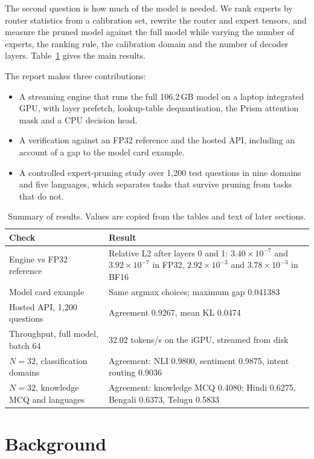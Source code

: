 \documentclass[11pt,a4paper]{article}
\begin{document}
The second question is how much of the model is needed. We rank experts by router statistics from a calibration set, rewrite the router and expert tensors, and measure the pruned model against the full model while varying the number of experts, the ranking rule, the calibration domain and the number of decoder layers. Table~\ref{tab:summary} gives the main results.

The report makes three contributions:
\begin{itemize}
\item A streaming engine that runs the full 106.2\,GB model on a laptop integrated GPU, with layer prefetch, lookup-table dequantisation, the Prism attention mask and a CPU decision head.
\item A verification against an FP32 reference and the hosted API, including an account of a gap to the model card example.
\item A controlled expert-pruning study over 1,200 test questions in nine domains and five languages, which separates tasks that survive pruning from tasks that do not.
\end{itemize}

\begin{table}[!htbp]
\centering
\small
\caption{Summary of results. Values are copied from the tables and text of later sections.}
\label{tab:summary}
\begin{tabular}{p{5.6cm}p{10.4cm}}
\toprule
Check & Result \\
\midrule
Engine vs FP32 reference & Relative L2 after layers 0 and 1: $3.40\times10^{-7}$ and $3.92\times10^{-7}$ in FP32, $2.92\times10^{-3}$ and $3.78\times10^{-3}$ in BF16 \\
Model card example & Same argmax choices; maximum gap 0.041383 \\
Hosted API, 1,200 questions & Agreement 0.9267, mean KL 0.0474 \\
Throughput, full model, batch 64 & 32.02 tokens/s on the iGPU, streamed from disk \\
$N=32$, classification domains & Agreement: NLI 0.9800, sentiment 0.9875, intent routing 0.9036 \\
$N=32$, knowledge MCQ and languages & Agreement: knowledge MCQ 0.4080; Hindi 0.6275, Bengali 0.6373, Telugu 0.5833 \\
\bottomrule
\end{tabular}
\end{table}

\section{Background}
\end{document}
